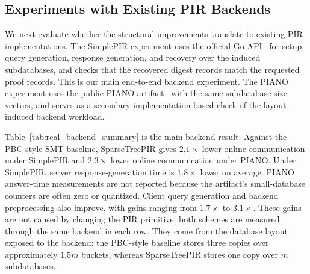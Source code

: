 \subsection{Experiments with Existing PIR Backends}

We next evaluate whether the structural improvements translate to existing PIR implementations. The SimplePIR experiment uses the official Go API~\cite{simplepir} for setup, query generation, response generation, and recovery over the induced subdatabases, and checks that the recovered digest records match the requested proof records. This is our main end-to-end backend experiment. The PIANO experiment uses the public PIANO artifact~\cite{piano} with the same subdatabase-size vectors, and serves as a secondary implementation-based check of the layout-induced backend workload.

\begin{table}[!t]
\centering
\caption{Repeated implementation-based backend results on real height-$128$ workloads. Each entry is a baseline/SparseTreePIR cost ratio averaged over six workloads, three seeds, and $50$ requested occupied targets per seed. Server-response gain is SimplePIR response-generation time; preprocessing gain is backend preprocessing only and excludes layout construction and metadata publication.}
\label{tab:real_backend_summary}
\scriptsize
\setlength{\tabcolsep}{3pt}
\end{table}

Table~\ref{tab:real_backend_summary} is the main backend result. Against the PBC-style SMT baseline, SparseTreePIR gives $2.1\times$ lower online communication under SimplePIR and $2.3\times$ lower online communication under PIANO. Under SimplePIR, server response-generation time is $1.8\times$ lower on average. PIANO answer-time measurements are not reported because the artifact's small-database counters are often zero or quantized. Client query generation and backend preprocessing also improve, with gains ranging from $1.7\times$ to $3.1\times$. These gains are not caused by changing the PIR primitive: both schemes are measured through the same backend in each row. They come from the database layout exposed to the backend: the PBC-style baseline stores three copies over approximately $1.5m$ buckets, whereas SparseTreePIR stores one copy over $m$ subdatabases.


